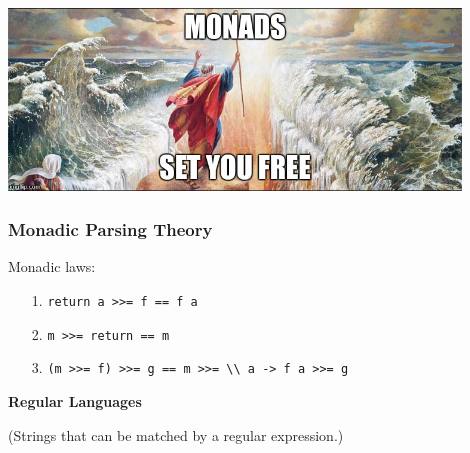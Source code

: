 \begin{frame}

\vspace{\fill}

\begin{center}

\includegraphics[width=0.9\textwidth]{memes/monads-set-you-free}

\end{center}

\vspace{\fill}

\end{frame}

\begin{frame}

\frametitle{Monadic Parsing Theory}



\bigskip

\pause

Monadic laws:

\begin{itemize}

\item[1.] \lstinline|return a >>= f == f a|

\item[2.] \lstinline|m >>= return == m|

\item[3.] \lstinline|(m >>= f) >>= g == m >>= \\ a -> f a >>= g|

\end{itemize}

\end{frame}


\begin{frame}

\vspace{\fill}

\begin{center}

{\Large \textbf{Regular Languages}}

\medskip

(Strings that can be matched by a regular expression.)

\end{center}

\vspace{\fill}

\end{frame}


